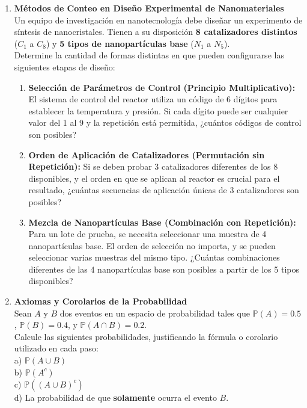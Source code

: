 \documentclass[12pt, a4paper]{article}
\begin{document}
\begin{enumerate}

    \item[\textbf{1.}] \textbf{Métodos de Conteo en Diseño Experimental de Nanomateriales}
    \\
    Un equipo de investigación en nanotecnología debe diseñar un experimento de síntesis de nanocristales. Tienen a su disposición \textbf{8 catalizadores distintos} ($C_1$ a $C_8$) y \textbf{5 tipos de nanopartículas base} ($N_1$ a $N_5$).
    \\
    Determine la cantidad de formas distintas en que pueden configurarse las siguientes etapas de diseño:
    \begin{enumerate}
        \item[\textbf{i)}] \textbf{Selección de Parámetros de Control (Principio Multiplicativo):} El sistema de control del reactor utiliza un código de 6 dígitos para establecer la temperatura y presión. Si cada dígito puede ser cualquier valor del 1 al 9 y la repetición está permitida, ¿cuántos códigos de control son posibles?
        \item[\textbf{ii)}] \textbf{Orden de Aplicación de Catalizadores (Permutación sin Repetición):} Si se deben probar 3 catalizadores diferentes de los 8 disponibles, y el orden en que se aplican al reactor es crucial para el resultado, ¿cuántas secuencias de aplicación únicas de 3 catalizadores son posibles?
        \item[\textbf{iii)}] \textbf{Mezcla de Nanopartículas Base (Combinación con Repetición):} Para un lote de prueba, se necesita seleccionar una muestra de 4 nanopartículas base. El orden de selección no importa, y se pueden seleccionar varias muestras del mismo tipo. ¿Cuántas combinaciones diferentes de las 4 nanopartículas base son posibles a partir de los 5 tipos disponibles?
    \end{enumerate}

    \vspace{0.8cm}

    \item[\textbf{2.}] \textbf{Axiomas y Corolarios de la Probabilidad}
    \\
    Sean $A$ y $B$ dos eventos en un espacio de probabilidad tales que $\mathbb{P}(A) = 0.5$, $\mathbb{P}(B) = 0.4$, y $\mathbb{P}(A \cap B) = 0.2$.
    \\
    Calcule las siguientes probabilidades, justificando la fórmula o corolario utilizado en cada paso:
    \\
    a) $\mathbb{P}(A \cup B)$
    \\
    b) $\mathbb{P}(A^c)$
    \\
    c) $\mathbb{P}((A \cup B)^c)$
    \\
    d) La probabilidad de que \textbf{solamente} ocurra el evento $B$.


\end{enumerate}
\end{document}
